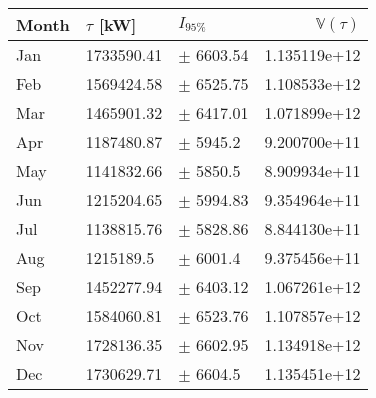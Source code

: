 \begin{tabular}{lllr}
\toprule
Month & $\tau$ [kW] &      $I_{95\%}$ &  $\mathbb{V}(\tau)$ \\
\midrule
  Jan &  1733590.41 &   $\pm$ 6603.54 &        1.135119e+12 \\
  Feb &  1569424.58 &   $\pm$ 6525.75 &        1.108533e+12 \\
  Mar &  1465901.32 &   $\pm$ 6417.01 &        1.071899e+12 \\
  Apr &  1187480.87 &    $\pm$ 5945.2 &        9.200700e+11 \\
  May &  1141832.66 &    $\pm$ 5850.5 &        8.909934e+11 \\
  Jun &  1215204.65 &   $\pm$ 5994.83 &        9.354964e+11 \\
  Jul &  1138815.76 &   $\pm$ 5828.86 &        8.844130e+11 \\
  Aug &   1215189.5 &    $\pm$ 6001.4 &        9.375456e+11 \\
  Sep &  1452277.94 &   $\pm$ 6403.12 &        1.067261e+12 \\
  Oct &  1584060.81 &   $\pm$ 6523.76 &        1.107857e+12 \\
  Nov &  1728136.35 &   $\pm$ 6602.95 &        1.134918e+12 \\
  Dec &  1730629.71 &    $\pm$ 6604.5 &        1.135451e+12 \\
\bottomrule
\end{tabular}

